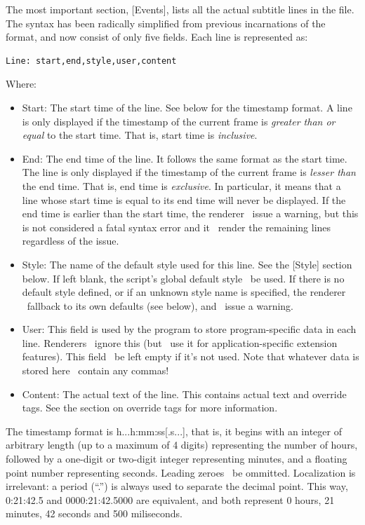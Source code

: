 \documentclass{spec}
\begin{document}
The most important section, [Events], lists all the actual subtitle lines in the file. The syntax has
been radically simplified from previous incarnations of the format, and now consist of only five fields.
Each line is represented as:

\begin{verbatim}
Line: start,end,style,user,content
\end{verbatim}

Where:

\begin{itemize}
\item Start: The start time of the line. See below for the timestamp format. A line is only displayed if
the timestamp of the current frame is \emph{greater than or equal} to the start time. That is, start
time is \emph{inclusive}.
\item End: The end time of the line. It follows the same format as the start time. The line is only
displayed if the timestamp of the current frame is \emph{lesser than} the end time. That is, end time is
\emph{exclusive}. In particular, it means that a line whose start time is equal to its end time will
never be displayed. If the end time is earlier than the start time, the renderer \should\ issue a warning,
but this is not considered a fatal syntax error and it \should\ render the remaining lines regardless of the issue.
\item Style: The name of the default style used for this line. See the [Style] section below. If left blank,
the script's global default style \must\ be used. If there is no default style defined, or if an unknown
style name is specified, the renderer \must\ fallback to its own defaults (see below), and \should\ issue a warning.
\item User: This field is used by the program to store program-specific data in each line. Renderers
\should\ ignore this (but \may\ use it for application-specific extension features). This field \should\
be left empty if it's not used. Note that whatever data is stored here \mustnot\ contain any commas!
\item Content: The actual text of the line. This contains actual text and override tags. See the section
on override tags for more information.
\end{itemize}

The timestamp format is h...h:mm:ss[.s...], that is, it begins with an integer of arbitrary length
(up to a maximum of 4 digits) representing the number of hours, followed by a one-digit or two-digit integer
representing minutes, and a floating point number representing seconds. Leading zeroes \may\ be ommitted.
Localization is irrelevant: a period (``.'') is always used to separate the decimal point. This way,
0:21:42.5 and 0000:21:42.5000 are equivalent, and both represent 0 hours, 21 minutes, 42 seconds and 500 miliseconds.
\end{document}

